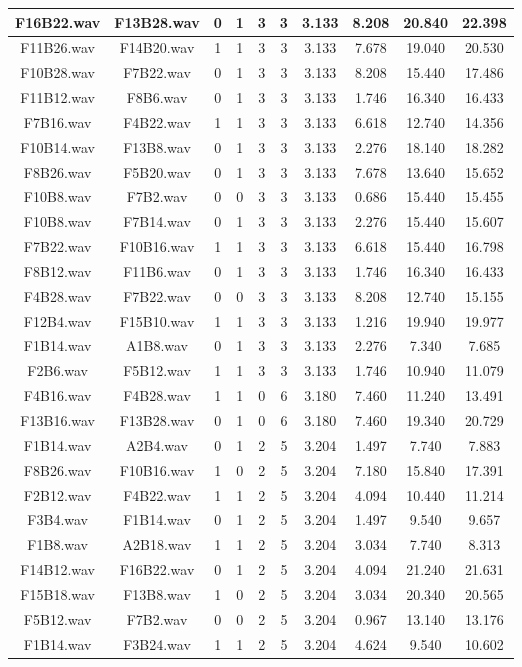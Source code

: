 \documentclass[11pt,a4paper]{book}
\begin{document}
\begin{longtable}[c]{|c|c|c|c|c|c|c|c|c|c|}
F16B22.wav&F13B28.wav&0&1&3&3&3.133&8.208&20.840&22.398\\ \hline
F11B26.wav&F14B20.wav&1&1&3&3&3.133&7.678&19.040&20.530\\ \hline
F10B28.wav&F7B22.wav&0&1&3&3&3.133&8.208&15.440&17.486\\ \hline
F11B12.wav&F8B6.wav&0&1&3&3&3.133&1.746&16.340&16.433\\ \hline
F7B16.wav&F4B22.wav&1&1&3&3&3.133&6.618&12.740&14.356\\ \hline
F10B14.wav&F13B8.wav&0&1&3&3&3.133&2.276&18.140&18.282\\ \hline
F8B26.wav&F5B20.wav&0&1&3&3&3.133&7.678&13.640&15.652\\ \hline
F10B8.wav&F7B2.wav&0&0&3&3&3.133&0.686&15.440&15.455\\ \hline
F10B8.wav&F7B14.wav&0&1&3&3&3.133&2.276&15.440&15.607\\ \hline
F7B22.wav&F10B16.wav&1&1&3&3&3.133&6.618&15.440&16.798\\ \hline
F8B12.wav&F11B6.wav&0&1&3&3&3.133&1.746&16.340&16.433\\ \hline
F4B28.wav&F7B22.wav&0&0&3&3&3.133&8.208&12.740&15.155\\ \hline
F12B4.wav&F15B10.wav&1&1&3&3&3.133&1.216&19.940&19.977\\ \hline
F1B14.wav&A1B8.wav&0&1&3&3&3.133&2.276&7.340&7.685\\ \hline
F2B6.wav&F5B12.wav&1&1&3&3&3.133&1.746&10.940&11.079\\ \hline
F4B16.wav&F4B28.wav&1&1&0&6&3.180&7.460&11.240&13.491\\ \hline
F13B16.wav&F13B28.wav&0&1&0&6&3.180&7.460&19.340&20.729\\ \hline
F1B14.wav&A2B4.wav&0&1&2&5&3.204&1.497&7.740&7.883\\ \hline
F8B26.wav&F10B16.wav&1&0&2&5&3.204&7.180&15.840&17.391\\ \hline
F2B12.wav&F4B22.wav&1&1&2&5&3.204&4.094&10.440&11.214\\ \hline
F3B4.wav&F1B14.wav&0&1&2&5&3.204&1.497&9.540&9.657\\ \hline
F1B8.wav&A2B18.wav&1&1&2&5&3.204&3.034&7.740&8.313\\ \hline
F14B12.wav&F16B22.wav&0&1&2&5&3.204&4.094&21.240&21.631\\ \hline
F15B18.wav&F13B8.wav&1&0&2&5&3.204&3.034&20.340&20.565\\ \hline
F5B12.wav&F7B2.wav&0&0&2&5&3.204&0.967&13.140&13.176\\ \hline
F1B14.wav&F3B24.wav&1&1&2&5&3.204&4.624&9.540&10.602\\ \hline

\end{longtable}
\end{document}
